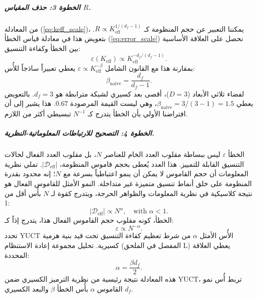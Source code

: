 \documentclass[12pt,a4paper]{article}
\newcommand{\Ke}{K_{\mathrm{eff}}}
\theoremstyle{remark}
\begin{document}
	\subparagraph*{الخطوة 3: حذف المقياس \(R\).}
	من المعادلة (\ref{eq:keff_scale})، يمكننا التعبير عن حجم المنظومة كـ \(R \propto \Ke^{1/(d_f-1)}\). بتعويض هذا في معادلة قياس الخطأ (\ref{eq:error_scale}) نحصل على العلاقة الأساسية بين الخطأ وكفاءة التنسيق:
	\begin{equation}
		\varepsilon(\Ke) \propto \Ke^{-d_f/(d_f-1)}.
		\label{eq:error_keff_naive}
	\end{equation}
	بمقارنة هذا مع القانون الشامل \(\varepsilon \propto \Ke^{-\beta}\) يعطي تعبيراً ساذجاً للأُس:
	\begin{equation}
		\beta_{\text{naive}} = \frac{d_f}{d_f-1}.
		\label{eq:beta_naive}
	\end{equation}
	لفضاء ثلاثي الأبعاد (\(D = 3\))، أقصى بعد كسيري لشبكة مترابطة هو \(d_f = 3\). بالتعويض يعطي \(\beta_{\text{naive}} = 3/(3-1) = 1.5\)، وهي ليست القيمة المرصودة \(0.67\). هذا يشير إلى أن افتراضنا الأولي بأن الخطأ يتدرج كـ \(N^{-1}\) تبسيطي أكثر من اللازم.
	
	\subparagraph*{الخطوة 4: التصحيح للارتباطات المعلوماتية-النظرية.}
	الخطأ \(\varepsilon\) ليس ببساطة مقلوب العدد الخام للعناصر \(N\)، بل مقلوب العدد الفعال لحالات التنسيق القابلة للتمييز. هذا العدد يُعطى بحجم قاموس المنظومة، \(|\mathcal{D}_{\text{eff}}|\). تملي نظرية المعلومات أن حجم القاموس لا يمكن أن ينمو اعتباطياً بسرعة مع \(N\)؛ إنه محدود بقدرة المنظومة على خلق أنماط تنسيق متميزة غير متداخلة. النمو الأمثل للقاموس الفعال هو نتيجة كلاسيكية في نظرية المعلومات والظواهر الحرجة، ويتدرج كقوة لـ \(N\) بأُس أقل من 1:
	\begin{equation}
		|\mathcal{D}_{\text{eff}}| \propto N^{\alpha}, \quad \text{with } \alpha < 1.
		\label{eq:dict_scale}
	\end{equation}
	الخطأ، كونه مقلوب حجم القاموس الفعال هذا، يتدرج إذاً كـ:
	\begin{equation}
		\varepsilon \propto N^{-\alpha}.
		\label{eq:error_scale_corrected}
	\end{equation}
	تحدد YUCT الأُس الأمثل \(\alpha\) من شرط تعظيم كفاءة التنسيق تحت قيد بنية هرمية كسيرية. تحليل مجموعة إعادة الاستنظام (المفصل في الملحق L) يعطي العلاقة المحددة:
	\begin{equation}
		\alpha = \frac{\beta d_f}{2}.
		\label{eq:alpha_from_beta}
	\end{equation}
	هذه المعادلة نتيجة رئيسية من نظرية الترميز الكسيري ضمن YUCT، تربط أُس نمو القاموس \(\alpha\) بأُس الخطأ \(\beta\) والبعد الكسيري \(d_f\).
	
\end{document}
